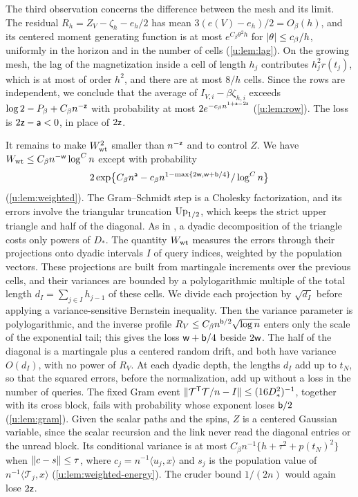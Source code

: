 The third observation concerns the difference between the mesh and its limit.
The residual $R_h=Z_V-\zeta_h-e_h/2$ has mean $3(e(V)-e_h)/2=O_\beta(h)$, and
its centered moment generating function is at most $e^{C_\beta\theta^2h}$ for
$\lvert \theta\rvert\le c_\beta/h$, uniformly in the horizon and in the number of cells
(\cref{u:lem:lag}). On the growing mesh, the lag of the magnetization inside a
cell of length $h_j$ contributes $h_j^2r(t_j)$, which is at most of order
$h^2$, and
there are at most $8/h$ cells. Since the rows are independent, we conclude that the average of
$I_{V,i}-\beta\zeta_{h,i}$ exceeds $\log2-P_\beta+C_\beta n^{-\mathsf{z}}$ with
probability at most $2e^{-c_\beta n^{1+\mathsf{a}-2\mathsf{z}}}$ (\cref{u:lem:row}). The
loss is $2\mathsf{z}-\mathsf{a}<0$, in place of $2\mathsf{z}$.

It remains to make $W_{\rm wt}^2$ smaller than $n^{-\mathsf{z}}$ and to control
$Z$. We have $W_{\rm wt}\le C_\beta n^{-\mathsf{w}}\log^Cn$ except with
probability
\[
 2\exp\bigl\{C_\beta n^{\mathsf{a}}-c_\beta n^{1-\max\{2\mathsf{w},\mathsf{w}+\mathsf{b}/4\}}/\log^Cn\bigr\}
\]
(\cref{u:lem:weighted}). The Gram--Schmidt step is a Cholesky factorization,
and its errors involve the triangular truncation $\operatorname{Up}_{1/2}$, which keeps the
strict upper triangle and half of the diagonal. As in
\cite[Section~4]{oai-typical-upper}, a dyadic decomposition of the triangle
costs only powers of $D_*$. The quantity $W_{\rm wt}$ measures the errors
through their projections onto dyadic intervals $I$ of query indices, weighted
by the population vectors. These projections are built from martingale
increments over the previous cells, and their variances are bounded by a
polylogarithmic multiple of the total length $d_I=\sum_{j\in I}h_{j-1}$ of
these cells. We divide each projection by $\sqrt{d_I}$ before applying a
variance-sensitive Bernstein inequality. Then the variance parameter is
polylogarithmic, and the inverse profile
$R_V\le C_\beta n^{\mathsf{b}/2}\sqrt{\log n}$ enters only the scale of the
exponential tail; this gives the loss $\mathsf{w}+\mathsf{b}/4$ beside $2\mathsf{w}$. The
half of the diagonal is a martingale plus a centered random drift, and both
have variance $O(d_I)$, with no power of $R_V$. At each dyadic depth, the
lengths $d_I$ add up to $t_N$, so that the squared errors, before the
normalization, add up without a
loss in the number of queries. The fixed Gram event
$\lVert \mathcal T^{\mathsf T}\mathcal T/n-I\rVert\le(16D_*^2)^{-1}$, together with
its cross block, fails with probability whose exponent loses $\mathsf{b}/2$
(\cref{u:lem:gram}). Given the scalar paths and the spins, $Z$ is a centered
Gaussian variable, since the scalar recursion and the link never read the
diagonal entries or the unread block. Its conditional variance is at most
$C_\beta n^{-1}\{h+\tau^2+p(t_N)^2\}$ when $\lVert c-s\rVert\le\tau$, where
$c_j=n^{-1}\langle u_j,x\rangle$ and $s_j$ is the population value of
$n^{-1}\langle\mathcal T_j,x\rangle$ (\cref{u:lem:weighted-energy}). The cruder bound $1/(2n)$ would
again lose $2\mathsf{z}$.

